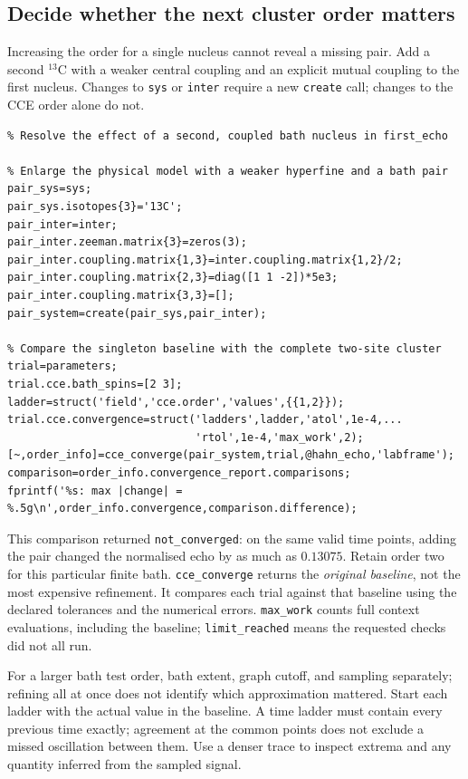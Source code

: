 \documentclass[11pt,a4paper]{article}
\newcommand{\code}[1]{\texttt{#1}}
\begin{document}
\subsection{Decide whether the next cluster order matters}
Increasing the order for a single nucleus cannot reveal a missing pair. Add a second $^{13}$C with a weaker central coupling and an explicit mutual coupling to the first nucleus. Changes to \code{sys} or \code{inter} require a new \code{create} call; changes to the CCE order alone do not.
\begin{lstlisting}
% Resolve the effect of a second, coupled bath nucleus in first_echo

% Enlarge the physical model with a weaker hyperfine and a bath pair
pair_sys=sys;
pair_sys.isotopes{3}='13C';
pair_inter=inter;
pair_inter.zeeman.matrix{3}=zeros(3);
pair_inter.coupling.matrix{1,3}=inter.coupling.matrix{1,2}/2;
pair_inter.coupling.matrix{2,3}=diag([1 1 -2])*5e3;
pair_inter.coupling.matrix{3,3}=[];
pair_system=create(pair_sys,pair_inter);

% Compare the singleton baseline with the complete two-site cluster
trial=parameters;
trial.cce.bath_spins=[2 3];
ladder=struct('field','cce.order','values',{{1,2}});
trial.cce.convergence=struct('ladders',ladder,'atol',1e-4,...
                             'rtol',1e-4,'max_work',2);
[~,order_info]=cce_converge(pair_system,trial,@hahn_echo,'labframe');
comparison=order_info.convergence_report.comparisons;
fprintf('%s: max |change| = %.5g\n',order_info.convergence,comparison.difference);
\end{lstlisting}
This comparison returned \code{not\_converged}: on the same valid time points, adding the pair changed the normalised echo by as much as $0.13075$. Retain order two for this particular finite bath. \code{cce\_converge} returns the \emph{original baseline}, not the most expensive refinement. It compares each trial against that baseline using the declared tolerances and the numerical errors. \code{max\_work} counts full context evaluations, including the baseline; \code{limit\_reached} means the requested checks did not all run.

For a larger bath test order, bath extent, graph cutoff, and sampling separately; refining all at once does not identify which approximation mattered. Start each ladder with the actual value in the baseline. A time ladder must contain every previous time exactly; agreement at the common points does not exclude a missed oscillation between them. Use a denser trace to inspect extrema and any quantity inferred from the sampled signal.
\end{document}
